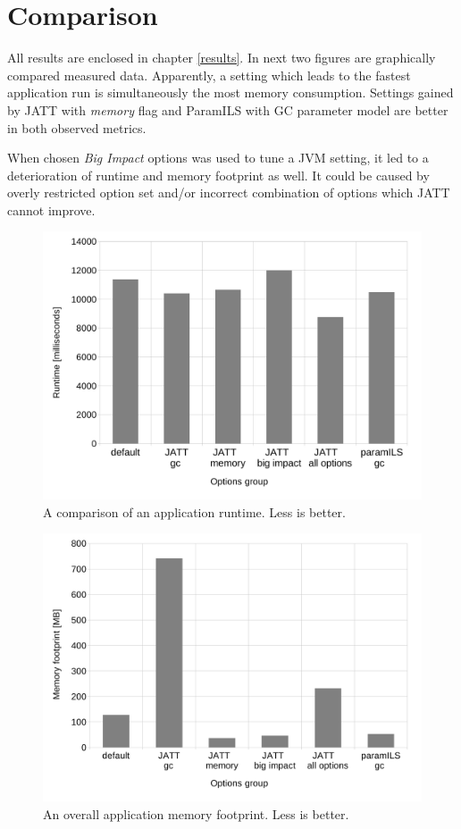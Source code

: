 \documentclass[
  digital, %
  oneside,
  notable, %
  nolof,     %
  nolot     %
]{fithesis3}
\begin{document}
\section{Comparison}
All results are enclosed in chapter \ref{results}. In next two figures are graphically compared measured data. Apparently, a setting which leads to the fastest application run is simultaneously the most memory consumption. Settings gained by JATT with \textit{memory} flag and ParamILS with GC parameter model are better in both observed metrics.

When chosen \textit{Big Impact} options was used to tune a JVM setting, it led to a deterioration of runtime and memory footprint as well. It could be caused by overly restricted option set and/or incorrect combination of options which JATT cannot improve.

\begin{figure}[h]
	\centering
	\includegraphics[width=13cm]{fig/runtimeBiggerFont.pdf}
	\caption{A comparison of an application runtime. Less is better.}
	\label{runtime}
\end{figure}

\begin{figure}[h]
	\centering
	\includegraphics[width=13cm]{fig/footprintBiggerFont.pdf}
	\caption{An overall application memory footprint. Less is better.}
	\label{footprint}
\end{figure}
\end{document}
